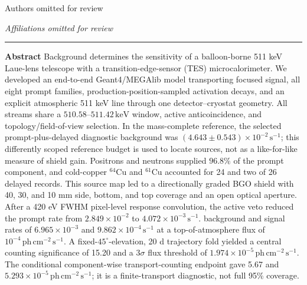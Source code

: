 \documentclass[11pt]{article}
\newcommand{\keV}{\ensuremath{\,\mathrm{keV}}}
\newcommand{\phcms}{\ensuremath{\,\mathrm{ph\,cm^{-2}\,s^{-1}}}}
\newcommand{\cps}{\ensuremath{\,\mathrm{s^{-1}}}}
\begin{document}
\thispagestyle{fancy}
\begin{flushleft}
{\LARGE\bfseries {}\par}
\vspace{1.1em}
{\large Authors omitted for review\par}
\vspace{0.3em}
{\normalsize\itshape Affiliations omitted for review\par}
\end{flushleft}
\vspace{0.7em}
\noindent\rule{\textwidth}{0.4pt}
\vspace{0.5em}

\noindent\textbf{Abstract}\hspace{0.7em}
Background determines the sensitivity of a balloon-borne 511 keV Laue-lens
telescope with a transition-edge-sensor (TES) microcalorimeter. We developed an
end-to-end Geant4/MEGAlib model transporting focused signal, all eight prompt
families, production-position-sampled activation decays, and an explicit
atmospheric 511 keV line through one detector--cryostat geometry. All streams
share a $510.58$--$511.42\keV$ window, active anticoincidence, and
topology/field-of-view selection. In the mass-complete reference, the selected
prompt-plus-delayed diagnostic background was $(4.643\pm0.543)\times10^{-2}\cps$;
this differently scoped reference budget is used to locate sources, not as a
like-for-like measure of shield gain. Positrons and neutrons supplied
$96.8\%$ of the prompt component, and cold-copper $^{64}$Cu and $^{61}$Cu
accounted for 24 and two of 26 delayed records. This source map led to a
directionally graded BGO shield with 40, 30, and 10 mm side, bottom, and top
coverage and an open optical aperture. After a 420 eV FWHM pixel-level response
convolution, the active veto reduced the prompt rate from
$2.849\times10^{-2}$ to $4.072\times10^{-3}\cps$. 
background and signal rates of $6.965\times10^{-3}$ and
$9.862\times10^{-4}\cps$ at a top-of-atmosphere flux of $10^{-4}\phcms$. A
fixed-$45^\circ$-elevation, 20 d trajectory fold yielded a central counting
significance of 15.20 and a $3\sigma$ flux threshold of
$1.974\times10^{-5}\phcms$. The conditional component-wise transport-counting
endpoint gave 5.67 and $5.293\times10^{-5}\phcms$; it is a finite-transport
diagnostic, not full 95\% coverage.
\end{document}
